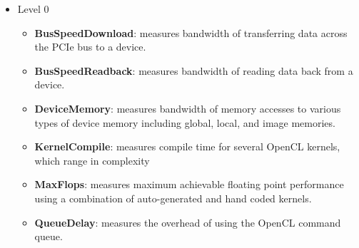 \documentclass[11pt]{article}
\begin{document}
\newpage 

\begin{itemize}
\item Level 0
    \begin{itemize}
        \item {\bf BusSpeedDownload}: measures bandwidth of transferring data 
         across the PCIe bus to a device.
        \item {\bf BusSpeedReadback}: measures bandwidth of reading data back
        from a device.
        \item {\bf DeviceMemory}: measures bandwidth of memory accesses to 
        various types of device memory including global, local, and image 
        memories.
        \item {\bf KernelCompile}: measures compile time for several OpenCL
        kernels, which range in complexity
        \item {\bf MaxFlops}: measures maximum achievable floating point 
        performance using a combination of auto-generated and hand coded 
        kernels.
        \item {\bf QueueDelay}: measures the overhead of using the OpenCL
        command queue.
    \end{itemize}


\end{itemize}
\end{document}
